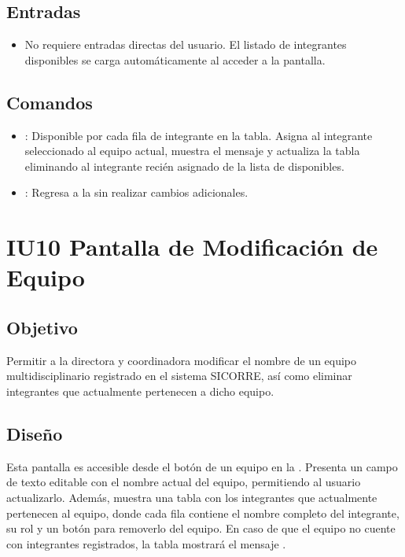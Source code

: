 \subsection{Entradas}
\begin{itemize}
	\item No requiere entradas directas del usuario. El listado 
	de integrantes disponibles se carga automáticamente al 
	acceder a la pantalla.
\end{itemize}

\subsection{Comandos}
\begin{itemize}
	\item {}: Disponible por cada fila de 
	integrante en la tabla. Asigna al integrante seleccionado 
	al equipo actual, muestra el mensaje 
	 y actualiza 
	la tabla eliminando al integrante recién asignado de la 
	lista de disponibles.
	
	\item {}: Regresa a la 
	 sin realizar cambios adicionales.
\end{itemize}


\section{IU10 Pantalla de Modificación de Equipo}

\subsection{Objetivo}
Permitir a la directora y coordinadora modificar el nombre de un equipo multidisciplinario registrado en el sistema SICORRE, así como eliminar integrantes que actualmente pertenecen a dicho equipo.

\subsection{Diseño}
Esta pantalla  es accesible desde el botón  de un equipo en la . Presenta un campo de texto editable con el nombre actual del equipo, permitiendo al usuario actualizarlo. Además, muestra una tabla con los integrantes que actualmente pertenecen al equipo, donde cada fila contiene el nombre completo del integrante, su rol y un botón  para removerlo del equipo. En caso de que el equipo no cuente con integrantes registrados, la tabla mostrará el mensaje .


